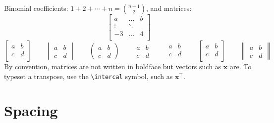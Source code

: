 \documentclass{article}
\begin{document}
Binomial coefficients:
\({\displaystyle 1 + 2 + \cdots + n = \binom{n+1}{2}}\), and matrices:
\begin{equation*}
  \begin{bmatrix}
    a & \dots & b \\
    \vdots  & \ddots & \\
    -3 & \dots & 4     \\
  \end{bmatrix}
\end{equation*}
\begin{equation*}
  \begin{bmatrix}
    a & b \\
    c & d \\
  \end{bmatrix}
  \qquad
  \begin{vmatrix}
    a & b \\
    c & d
  \end{vmatrix}
  \qquad
  \begin{pmatrix}
    a & b \\
    c & d
  \end{pmatrix}
  \qquad
  \begin{matrix}
    a & b \\
    c & d
  \end{matrix}
  \qquad
  \begin{smallmatrix}
    a & b \\
    c & d \\
  \end{smallmatrix}
  \qquad
  \left[
  \begin{smallmatrix}
    a & b \\
    c & d \\
  \end{smallmatrix}
  \right]
  \qquad
  \begin{Vmatrix}
    a & b \\
    c & d
  \end{Vmatrix}
\end{equation*}
By convention, matrices are not written in boldface but vectors such as
\(\mathbf{x}\) are.  To typeset a transpose, use the \verb~\intercal~ symbol, such as
\(\mathbf{x}^\intercal\).

\section{Spacing}
\end{document}
